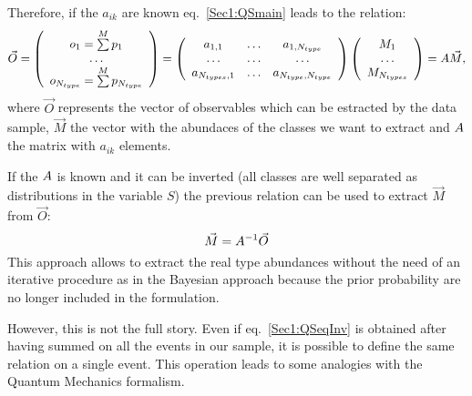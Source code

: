 Therefore, if the $a_{ik}$ are known eq.~\ref{Sec1:QSmain} leads to the
relation:
\begin{equation}
\label{Sec1:QSformula}
\vec{O} =
 \left(
\begin{array}{c}
o_1 = \sum\limits^{M} p_{1}\\
\ldots \\
o_{N_{type}}=\sum\limits^{M} p_{N_{type}}
\end{array}
\right) =
\left(
\begin{array}{ccc}
a_{1,1} & \ldots & a_{1,N_{type}} \\
\ldots & \ldots & \ldots \\
a_{N_{types},1} & \ldots & a_{N_{type},N_{type}}
\end{array}
\right)
\left(
\begin{array}{c}
M_{1}\\
\ldots \\
M_{N_{types}}
\end{array}
\right) =
\boldmath{A} \vec{M},
\end{equation}
where $\vec{O}$ represents the vector of observables which can be estracted by the data
sample, $\vec{M}$ the vector with the abundaces of the classes we want to
extract and $\boldmath{A}$ the matrix with $a_{ik}$ elements.

If the $\boldmath{A}$ is known and it can be inverted (all classes are
well separated as distributions in the variable $S$) the previous relation can
be used to extract $\vec{M}$ from $\vec{O}$:
\begin{equation}
\label{Sec1:QSeqInv}
\vec{M} = \boldmath{A^{-1}} \vec{O}
\end{equation}
This approach allows to extract the real type abundances without the need of
an iterative procedure as in the Bayesian approach because the prior
probability are no longer included in the formulation.

However, this is not the full story. Even if eq.~\ref{Sec1:QSeqInv} is
obtained after having summed on all the events in our sample, it is possible
to define the same relation on a single event. This operation leads to some
analogies with the Quantum Mechanics formalism.

